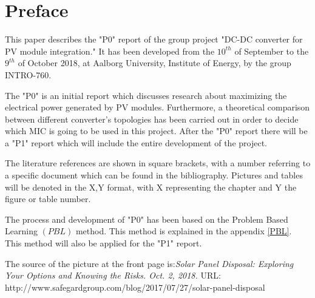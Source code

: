 \chapter*{Preface}

This paper describes the "P0" report of the group project "DC-DC converter for PV module integration." It has been developed from the $10^{th}$ of September to the $9^{th}$ of October 2018, at Aalborg University, Institute of Energy, by the group INTRO-760.

The "P0" is an initial report which discusses research about maximizing the electrical power generated by PV modules.
Furthermore, a theoretical comparison between different converter's topologies has been carried out in order to decide which MIC is going to be used in this project. After the "P0" report there will be a "P1" report which will include the entire development of the project.

The literature references are shown in square brackets, with a number referring to a specific document which can be found in the bibliography. Pictures and tables will be denoted in the X,Y format, with X representing the chapter and Y the figure or table number. 

The process and development of "P0" has been based on the Problem Based Learning $(PBL)$ method. This method is explained in the appendix \ref{PBL}. This method will also be applied for the "P1" report.

The source of the picture at the front page is:\newline \textit{Solar Panel Disposal: Exploring Your Options and Knowing the Risks. Oct. 2, 2018.} URL: http://www.safegardgroup.com/blog/2017/07/27/solar-panel-disposal
